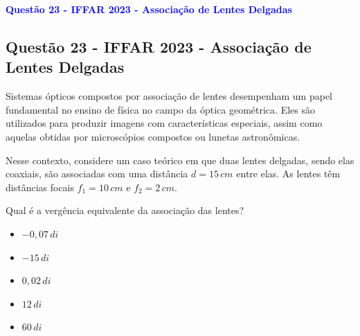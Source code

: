 \begin{flushleft}
\textbf{\textcolor{blue}{\Large Quest\~ao 23 - IFFAR 2023 - Associa\c{c}\~ao de Lentes Delgadas}}\\
\noindent

\subsection{Quest\~ao 23 - IFFAR 2023 - Associa\c{c}\~ao de Lentes Delgadas}

Sistemas \'opticos compostos por associa\c{c}\~ao de lentes desempenham um papel fundamental no ensino de f\'isica no campo da \'optica geom\'etrica. Eles s\~ao utilizados para produzir imagens com caracter\'isticas especiais, assim como aquelas obtidas por microsc\'opios compostos ou lunetas astron\^omicas.

Nesse contexto, considere um caso te\'orico em que duas lentes delgadas, sendo elas coaxiais, s\~ao associadas com uma dist\^ancia $d = 15\,cm$ entre elas. As lentes t\^em dist\^ancias focais $f_1 = 10\,cm$ e $f_2 = 2\,cm$.

Qual \'e a verg\^encia equivalente da associa\c{c}\~ao das lentes?

\begin{itemize}
\item[(A)] $-0{,}07\,di$
\item[(B)] $-15\,di$
\item[(C)] $0{,}02\,di$
\item[(D)] $12\,di$
\item[(E)] $60\,di$
\end{itemize}

\vspace{0.5cm}

\begin{center}
\end{center}
\end{flushleft}

